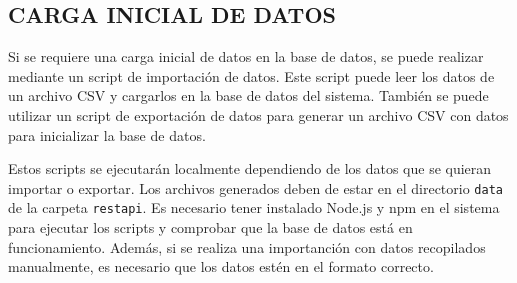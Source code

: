 \begin{enumerate}
\newpage
\section{CARGA INICIAL DE DATOS}
Si se requiere una carga inicial de datos en la base de datos, se puede realizar mediante un script de importación de datos.
Este script puede leer los datos de un archivo CSV y cargarlos en la base de datos del sistema.
También se puede utilizar un script de exportación de datos para generar un archivo CSV con datos para inicializar la base de datos.

Estos scripts se ejecutarán localmente dependiendo de los datos que se quieran importar o exportar.
Los archivos generados deben de estar en el directorio \texttt{data} de la carpeta \texttt{restapi}.
Es necesario tener instalado Node.js y npm en el sistema para ejecutar los scripts y comprobar que la base de datos está en funcionamiento.
Además, si se realiza una importanción con datos recopilados manualmente, es necesario que los datos estén en el formato correcto.


\end{enumerate}
